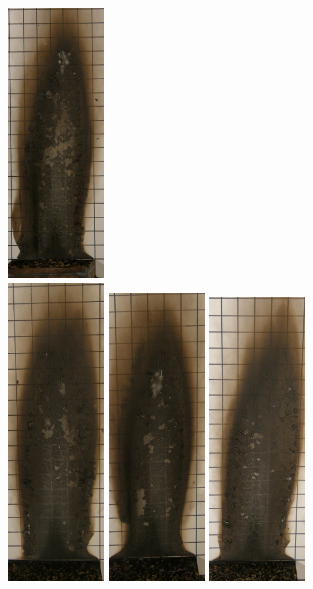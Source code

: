 \documentclass[twoside]{uocthesis}
\begin{document}
\begin{figure}[p]
	\includegraphics[width=1.0in]{../Figures/GBNG18_P5130386} \\

	\includegraphics[width=1.0in]{../Figures/GBNG19_P5130390}
	\includegraphics[width=1.0in]{../Figures/GBNG20_P5130392}
	\includegraphics[width=1.0in]{../Figures/GBNG21_P5130398}

\end{figure}
\end{document}
